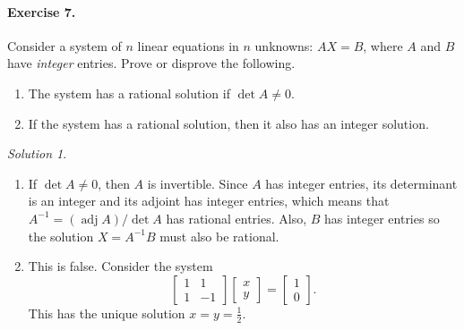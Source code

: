 \documentclass[11pt]{report}
\theoremstyle{remark}
\newtheorem*{solution}{Solution}
\begin{document}
    \paragraph{Exercise 7.} Consider a system of $n$ linear equations in $n$ unknowns:
    $AX = B$, where $A$ and $B$ have \textit{integer} entries. Prove or disprove the
    following.
    \begin{enumerate}
        \itemsep0em
        \item The system has a rational solution if $\det{A} \neq 0$.
        \item If the system has a rational solution, then it also has an integer
        solution.
    \end{enumerate}
    \begin{solution}\mbox{}
    \begin{enumerate}
        \itemsep0em
        \item If $\det{A} \neq 0$, then $A$ is invertible. Since $A$ has integer
        entries, its determinant is an integer and its adjoint has integer entries,
        which means that $A^{-1} = (\operatorname{adj}{A})/\det{A}$ has rational
        entries. Also, $B$ has integer entries so the solution $X = A^{-1}B$ must
        also be rational.
        \item This is false. Consider the system \[
            \begin{bmatrix}
                1 & 1 \\ 1 & -1
            \end{bmatrix} \begin{bmatrix}
                x \\ y
            \end{bmatrix} = \begin{bmatrix}
                1 \\ 0
            \end{bmatrix}.
        \] This has the unique solution $x = y = \frac{1}{2}$.
    \end{enumerate}
    \end{solution}
    
\end{document}
